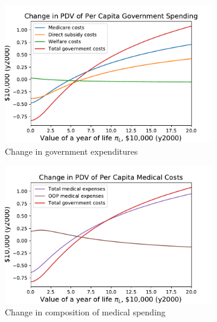 \documentclass[12pt,pdftex,letterpaper]{article}
\begin{document}
\begin{figure}[h!]
    \centering
    \begin{subfigure}[b]{0.49\textwidth}
        \centering
        \includegraphics[width=\textwidth]{../Figures/SocOptByLifePriceGovtChange.pdf}
        \caption{Change in government expenditures}
    \end{subfigure}
    \begin{subfigure}[b]{0.49\textwidth}
        \centering
        \includegraphics[width=\textwidth]{../Figures/SocOptByLifePriceMedChange.pdf}
        \caption{Change in composition of medical spending}
    \end{subfigure}
    \begin{subfigure}[b]{0.49\textwidth}
        \centering

\end{subfigure}
\end{figure}
\end{document}

